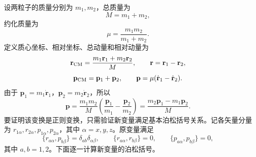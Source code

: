 \begin{solution}[正则变换例子]
\answer
设两粒子的质量分别为 \(m_1,m_2\)，总质量为
\[
M=m_1+m_2,
\]
约化质量为
\[
\mu=\frac{m_1m_2}{m_1+m_2}.
\]
定义质心坐标、相对坐标、总动量和相对动量为
\[
\mathbf r_{\rm CM}=\frac{m_1\mathbf r_1+m_2\mathbf r_2}{M},\qquad
\mathbf r=\mathbf r_1-\mathbf r_2,
\]
\[
\mathbf p_{\rm CM}=\mathbf p_1+\mathbf p_2,\qquad
\mathbf p=\mu(\dot{\mathbf r}_1-\dot{\mathbf r}_2).
\]
由于 \(\mathbf p_1=m_1\dot{\mathbf r}_1\)，\(\mathbf p_2=m_2\dot{\mathbf r}_2\)，所以
\[
\mathbf p
=
\frac{m_1m_2}{M}
\left(
\frac{\mathbf p_1}{m_1}
-
\frac{\mathbf p_2}{m_2}
\right)
=
\frac{m_2\mathbf p_1-m_1\mathbf p_2}{M}.
\]
要证明该变换是正则变换，只需验证新变量满足基本泊松括号关系。记各矢量分量为 \(r_{1\alpha},r_{2\alpha},p_{1\alpha},p_{2\alpha}\)，其中 \(\alpha=x,y,z\)。原变量满足
\[
\{r_{a\alpha},p_{b\beta}\}=\delta_{ab}\delta_{\alpha\beta},\qquad
\{r_{a\alpha},r_{b\beta}\}=0,\qquad
\{p_{a\alpha},p_{b\beta}\}=0,
\]
其中 \(a,b=1,2\)。下面逐一计算新变量的泊松括号。


\end{solution}

